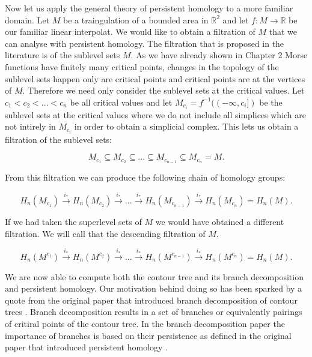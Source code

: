 Now let us apply the general theory of persistent homology to a more familiar domain. Let $M$ be a traingulation of a bounded area in $\mathbb{R}^2$ and let $f: M \to \mathbb{R}$ be our familiar linear interpolat. We would like to obtain a filtration of $M$ that we can analyse with persistent homology. The filtration that is proposed in the literature \cite{comp-topo} is of the sublevel sets $M$. As we have already shown in Chapter 2 Morse functions have finitely many critical points, changes in the topology of the sublevel sets happen only are critical points and critical points are at the vertices of $M$. Therefore we need only consider the sublevel sets at the critical values. Let $c_1 < c_2 < ... < c_n$ be all critical values and let $M_{c_i} = f^{-1}((-\infty, c_i])$ be the sublevel sets at the critical values where we do not include all simplices which are not intirely in $M_{c_i}$ in order to obtain a simplicial complex. This lets us obtain a filtration of the sublevel sets:

$$ M_{c_1} \subseteq M_{c_2} \subseteq ... \subseteq M_{c_{n-1}} \subseteq M_{c_n} = M.$$

From this filtration we can produce the following chain of homology groups:

$$ H_n(M_{c_1}) \overset{i_*}{\longrightarrow} H_n(M_{c_2}) \overset{i_*}{\longrightarrow} ... \overset{i_*}{\longrightarrow} H_n(M_{c_{n-1}}) \overset{i_*}{\longrightarrow} H_n(M_{c_n}) = H_n(M).$$

If we had taken the superlevel sets of $M$ we would have obtained a different filtration. We will call that the descending filtration of $M$.

$$ H_n(M^{c_1}) \overset{i_*}{\longrightarrow} H_n(M^{c _2}) \overset{i_*}{\longrightarrow} ... \overset{i_*}{\longrightarrow} H_n(M^{c_{n-1}}) \overset{i_*}{\longrightarrow} H_n(M^{c_n}) = H_n(M).$$

We are now able to compute both the contour tree and its branch decomposition and persistent homology. Our motivation behind doing so has been sparked by a quote from the original paper that introduced branch decomposition of contour trees \cite{ct-branch-decomp}. Branch decomposition results in a set of branches or equivalently pairings of critiral points of the contour tree. In the branch decomposition paper the importance of branches is based on their persistence as defined in the original paper that introduced persistent homology \cite{persistence-original}.

